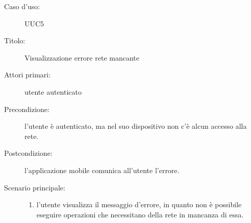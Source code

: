 \documentclass[../../../analisi-dei-requisiti.tex]{subfiles}
\begin{document}
\begin{description}
  \item[Caso d’uso:] UUC5
  \item[Titolo:] Visualizzazione errore rete mancante
  \item[Attori primari:] utente autenticato
  \item[Precondizione:] l'utente è autenticato, ma nel suo dispositivo non c'è alcun accesso alla rete.
  \item[Postcondizione:] l'applicazione mobile comunica all'utente l'errore.
  \item[Scenario principale:]
        \begin{enumerate}
          \item l'utente visualizza il messaggio d'errore, in quanto non è possibile eseguire operazioni che necessitano della rete in mancanza di essa.
        \end{enumerate}
\end{description}
\end{document}
